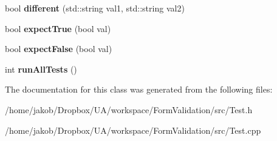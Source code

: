 \begin{DoxyCompactItemize}
\item 
\hypertarget{classFA_1_1Test_a58eca28fb723a19624588d31eb88a02b}{bool {\bfseries different} (std\-::string val1, std\-::string val2)}\label{classFA_1_1Test_a58eca28fb723a19624588d31eb88a02b}

\item 
\hypertarget{classFA_1_1Test_a1c437ba502472f06e9776f387d119936}{bool {\bfseries expect\-True} (bool val)}\label{classFA_1_1Test_a1c437ba502472f06e9776f387d119936}

\item 
\hypertarget{classFA_1_1Test_ad982aef1abfe5c8e37307409ae930d6a}{bool {\bfseries expect\-False} (bool val)}\label{classFA_1_1Test_ad982aef1abfe5c8e37307409ae930d6a}

\item 
\hypertarget{classFA_1_1Test_a57bd45613fe1bc069755089cbe1bd5fb}{int {\bfseries run\-All\-Tests} ()}\label{classFA_1_1Test_a57bd45613fe1bc069755089cbe1bd5fb}

\end{DoxyCompactItemize}


The documentation for this class was generated from the following files\-:\begin{DoxyCompactItemize}
\item 
/home/jakob/\-Dropbox/\-U\-A/workspace/\-Form\-Validation/src/Test.\-h\item 
/home/jakob/\-Dropbox/\-U\-A/workspace/\-Form\-Validation/src/Test.\-cpp\end{DoxyCompactItemize}

